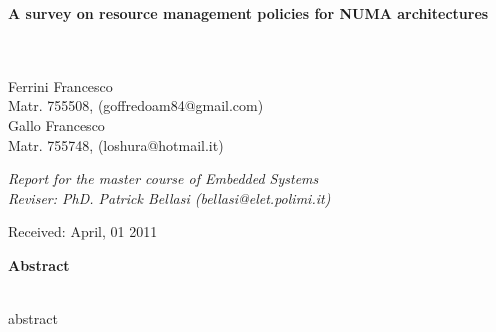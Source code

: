 \documentclass[a4paper,10pt]{article}
\newenvironment*{mytitle}{\begin{LARGE}\bf}{\end{LARGE}\\}%
\newenvironment*{myabstract}{\begin{Large}\bf}{\end{Large}\\[2.5ex]}%
\begin{document}
\begin{mytitle}A survey on resource management policies for NUMA architectures\end{mytitle}
%
%
\\
Ferrini Francesco\\
Matr. 755508, (goffredoam84@gmail.com)\\
\hspace{10ex}
Gallo Francesco\\
Matr. 755748, (loshura@hotmail.it)\\
\begin{flushright}
\emph{Report for the master course of Embedded Systems}\\
\emph{Reviser: PhD. Patrick Bellasi (bellasi@elet.polimi.it)}
\end{flushright}

Received: April, 01 2011\\
\hspace{10ex}

\begin{myabstract} Abstract \end{myabstract}
abstract
\end{document}
